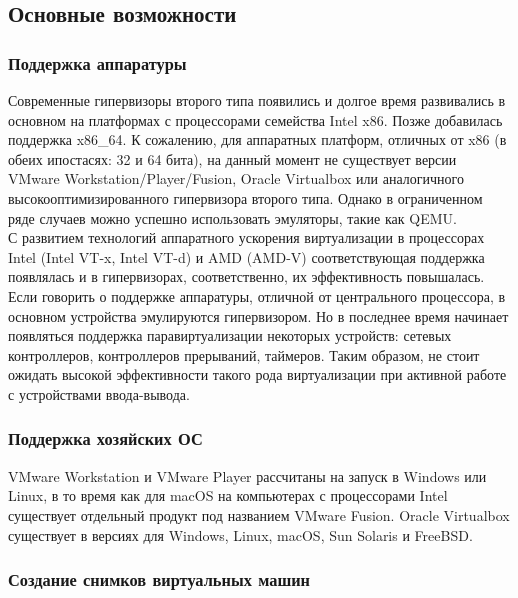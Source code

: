 \documentclass[14pt, a4paper]{article}
\begin{document}
\subsection*{Основные возможности}

\subsubsection*{Поддержка аппаратуры}

Современные гипервизоры второго типа появились и долгое время развивались в основном на
платформах с процессорами семейства Intel x86. Позже добавилась поддержка x86\_64. К сожалению,
для аппаратных платформ, отличных от x86 (в обеих ипостасях: 32 и 64 бита), на данный момент не
существует версии VMware Workstation/Player/Fusion, Oracle Virtualbox или аналогичного
высокооптимизированного гипервизора второго типа. Однако в ограниченном ряде случаев можно
успешно использовать эмуляторы, такие как QEMU.\\

С развитием технологий аппаратного ускорения виртуализации в процессорах Intel (Intel VT-x, Intel
VT-d) и AMD (AMD-V) соответствующая поддержка появлялась и в гипервизорах, соответственно, их
эффективность повышалась.\\

Если говорить о поддержке аппаратуры, отличной от центрального процессора, в основном
устройства эмулируются гипервизором. Но в последнее время начинает появляться поддержка
паравиртуализации некоторых устройств: сетевых контроллеров, контроллеров прерываний,
таймеров. Таким образом, не стоит ожидать высокой эффективности такого рода виртуализации при
активной работе с устройствами ввода-вывода.

\subsubsection*{Поддержка хозяйских ОС}

VMware Workstation и VMware Player рассчитаны на запуск в Windows или Linux, в то время как для
macOS на компьютерах с процессорами Intel существует отдельный продукт под названием VMware
Fusion. Oracle Virtualbox существует в версиях для Windows, Linux, macOS, Sun Solaris и FreeBSD.


\newpage

\subsubsection*{Создание снимков виртуальных машин}
\end{document}
